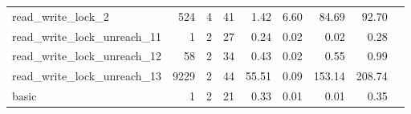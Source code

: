 {\begin{tabular}{l|r|r|r|r|r|r|r|l}
read\_write\_lock\_2                        & 524                                                                                               & 4                                                                                                & 41                                                                                                                   & 1.42                            & 6.60                    & {\color[HTML]{00009B} 84.69}   & 92.70                      & \cite{cds}                                              \\
read\_write\_lock\_unreach\_11              & 1                                                                                                 & 2                                                                                                & 27                                                                                                                   & 0.24                            & 0.02                    & {\color[HTML]{00009B} 0.02}    & 0.28                       & \cite{cds}                                              \\
read\_write\_lock\_unreach\_12              & 58                                                                                                & 2                                                                                                & 34                                                                                                                   & 0.43                            & 0.02                    & {\color[HTML]{00009B} 0.55}    & 0.99                       & \cite{cds}                                              \\
read\_write\_lock\_unreach\_13              & 9229                                                                                              & 2                                                                                                & 44                                                                                                                   & 55.51                           & 0.09                    & {\color[HTML]{00009B} 153.14}  & 208.74                     & \cite{cds}                                              \\
basic                                       & 1                                                                                                 & 2                                                                                                & 21                                                                                                                   & 0.33                            & 0.01                    & {\color[HTML]{00009B} 0.01}    & 0.35                       &                                                         \\

\end{tabular}}
